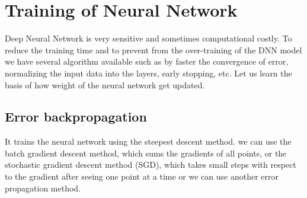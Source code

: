 














\section{Training of Neural Network}
Deep Neural Network is very sensitive and sometimes computational costly. To reduce the training time and to prevent from the over-training of the DNN model we have several algorithm available such as by faster the convergence of error, normalizing the input data into the layers, early stopping, etc. Let us learn the basis of how weight of the neural network get updated.

\subsection{Error backpropagation}
It trains the neural network using the steepest descent method. we can use the batch gradient descent method, which sums the gradients of all points, or the  stochastic gradient descent method (SGD), which takes small steps with respect to the gradient after seeing one point at a time\cite{10.5555/2968826.2968922} or we can use another error propagation method. 

